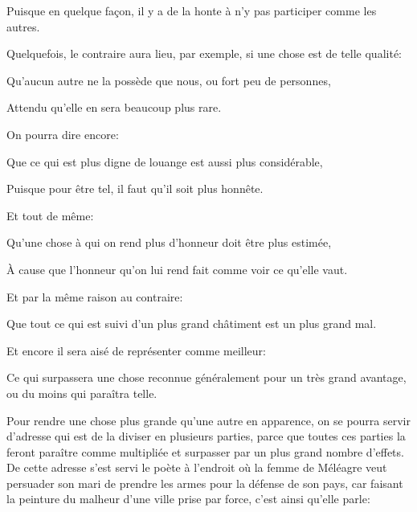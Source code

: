 Puisque en quelque façon, il y a de la honte à n'y pas participer comme les autres.

Quelquefois, le contraire aura lieu, par exemple, si une chose est de telle qualité:

\begin{lieu}
	Qu'aucun autre ne la possède que nous, ou fort peu de personnes,
\end{lieu}

Attendu qu'elle en sera beaucoup plus rare.

\bigbreak

On pourra dire encore:

\begin{lieu}
	Que ce qui est plus digne de louange est aussi plus considérable,
\end{lieu}

Puisque pour être tel, il faut qu'il soit plus honnête.

\bigbreak

Et tout de même:

\begin{lieu}
	Qu'une chose à qui on rend plus d'honneur doit être plus estimée,
\end{lieu}

À cause que l'honneur qu'on lui rend fait comme voir ce qu'elle vaut.

Et par la même raison au contraire:

\begin{lieu}
	Que tout ce qui est suivi d'un plus grand châtiment est un plus grand mal.
\end{lieu}

\bigbreak

Et encore il sera aisé de représenter comme meilleur:

\begin{lieu}
	Ce qui surpassera une chose reconnue généralement pour un très grand avantage, ou du moins qui paraîtra telle.
\end{lieu}

\bigbreak

Pour rendre une chose plus grande qu'une autre en apparence, on se pourra servir d'adresse qui est de la diviser en
plusieurs parties, parce que toutes ces parties la feront paraître comme multipliée et surpasser par un plus grand
nombre d'effets. De cette adresse s'est servi le poète à l'endroit où la femme de Méléagre veut persuader son mari de
prendre les armes pour la défense de son pays, car faisant la peinture du malheur d'une ville prise par force, c'est
ainsi qu'elle parle:

